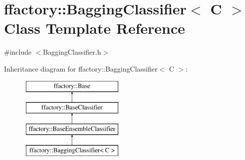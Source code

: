 \hypertarget{classffactory_1_1_bagging_classifier}{\section{ffactory\-:\-:Bagging\-Classifier$<$ C $>$ Class Template Reference}
\label{classffactory_1_1_bagging_classifier}
}


{\ttfamily \#include $<$Bagging\-Classifier.\-h$>$}

Inheritance diagram for ffactory\-:\-:Bagging\-Classifier$<$ C $>$\-:\begin{figure}[H]
\begin{center}
\leavevmode
\includegraphics[height=4.000000cm]{classffactory_1_1_bagging_classifier}
\end{center}
\end{figure}

